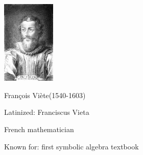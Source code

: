 \begin{frame}
\hfil\hfil \includegraphics[height=4cm]{../../modules/history/pictures/francoisviete.jpg}

\hfil\hfil Fran\c{c}ois Vi\`ete(1540-1603)


\hfil\hfil Latinized: Franciscus Vieta

\hfil\hfil French mathematician

\hfil\hfil Known for: first symbolic algebra textbook
\end{frame}